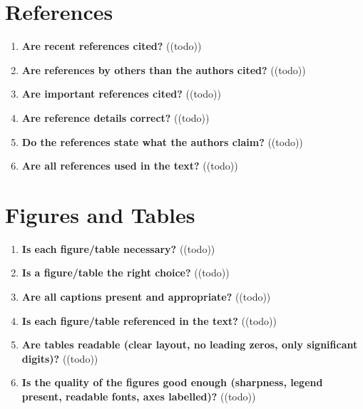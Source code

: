\section{References}\label{sec:references}
\begin{enumerate}[resume]
    \item \textbf{Are recent references cited?} 	\textcolor{HighlightColor}{((todo))}
    \item \textbf{Are references by others than the authors cited?} 	\textcolor{HighlightColor}{((todo))}
    \item \textbf{Are important references cited?} 	\textcolor{HighlightColor}{((todo))}
    \item \textbf{Are reference details correct?} 	\textcolor{HighlightColor}{((todo))}
    \item \textbf{Do the references state what the authors claim?} 	\textcolor{HighlightColor}{((todo))}
    \item \textbf{Are all references used in the text?} 	\textcolor{HighlightColor}{((todo))}
\end{enumerate}

\section{Figures and Tables}\label{sec:figures}
\begin{enumerate}[resume]
    \item \textbf{Is each figure/table necessary?} 	\textcolor{HighlightColor}{((todo))}
    \item \textbf{Is a figure/table the right choice?} 	\textcolor{HighlightColor}{((todo))}
    \item \textbf{Are all captions present and appropriate?} 	\textcolor{HighlightColor}{((todo))}
    \item \textbf{Is each figure/table referenced in the text?} 	\textcolor{HighlightColor}{((todo))}
    \item \textbf{Are tables readable (clear layout, no leading zeros, only significant digits)?} 	\textcolor{HighlightColor}{((todo))}
    \item \textbf{Is the quality of the figures good enough (sharpness, legend present, readable fonts, axes labelled)?} 	\textcolor{HighlightColor}{((todo))}
\end{enumerate}

